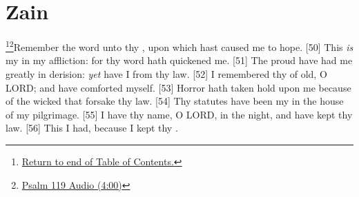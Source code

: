 \section*{Zain}
\footnote{\textcolor[cmyk]{0.99998,1,0,0}{\hyperlink{TOC}{Return to end of Table of Contents.}}}\footnote{\href{https://www.audioverse.org/english/audiobibles/books/ENGKJV/O/Ps/1}{\textcolor[cmyk]{0.99998,1,0,0}{Psalm 119 Audio (4:00)}}}\textcolor[cmyk]{0.99998,1,0,0}{Remember the word unto thy , upon which  hast caused me to hope.}
[50] \textcolor[cmyk]{0.99998,1,0,0}{This \emph{is} my  in my affliction: for thy word hath quickened me.}
[51] \textcolor[cmyk]{0.99998,1,0,0}{The proud have had me greatly in derision: \emph{yet} have I  from thy law.}
[52] \textcolor[cmyk]{0.99998,1,0,0}{I remembered thy  of old, O LORD; and have comforted myself.}
[53] \textcolor[cmyk]{0.99998,1,0,0}{Horror hath taken hold upon me because of the wicked that forsake thy law.}
[54] \textcolor[cmyk]{0.99998,1,0,0}{Thy statutes have been my  in the house of my pilgrimage.}
[55] \textcolor[cmyk]{0.99998,1,0,0}{I have  thy name, O LORD, in the night, and have kept thy law.}
[56] \textcolor[cmyk]{0.99998,1,0,0}{This I had, because I kept thy .}